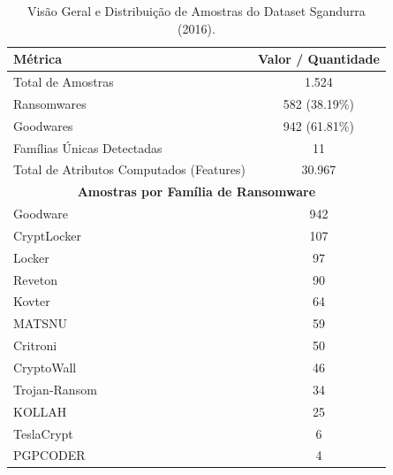 \begin{table}[htbp]
    \centering
    \caption{Visão Geral e Distribuição de Amostras do Dataset Sgandurra (2016).}
    \label{tab:dataset-stats}
    \begin{tabular}{|l|c|}
    \hline
    \textbf{Métrica} & \textbf{Valor / Quantidade} \\ \hline
    Total de Amostras & 1.524 \\ \hline
    Ransomwares & 582 (38.19\%) \\ \hline
    Goodwares & 942 (61.81\%) \\ \hline
    Famílias Únicas Detectadas & 11 \\ \hline
    Total de Atributos Computados (Features) & 30.967 \\ \hline
    \hline
    \multicolumn{2}{|c|}{\textbf{Amostras por Família de Ransomware}} \\ \hline
    Goodware & 942 \\ \hline
    CryptLocker & 107 \\ \hline
    Locker & 97 \\ \hline
    Reveton & 90 \\ \hline
    Kovter & 64 \\ \hline
    MATSNU & 59 \\ \hline
    Critroni & 50 \\ \hline
    CryptoWall & 46 \\ \hline
    Trojan-Ransom & 34 \\ \hline
    KOLLAH & 25 \\ \hline
    TeslaCrypt & 6 \\ \hline
    PGPCODER & 4 \\ \hline
    \end{tabular}
\end{table}

